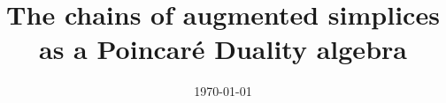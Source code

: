 \documentclass{amsart}
\title[Short title]{The chains of augmented simplices as a Poincar\'e Duality algebra}
\date{\today}
\begin{document}
	
	\maketitle
	
	
	
	
	\sloppy
	\printbibliography
\end{document}
